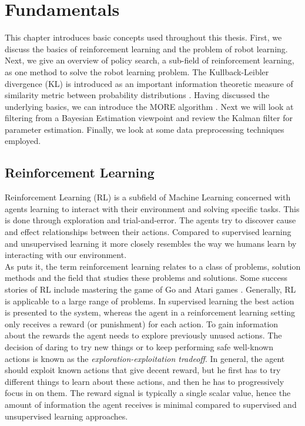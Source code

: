 
\chapter{Fundamentals}
This chapter introduces basic concepts used throughout this thesis.
First, we discuss the basics of reinforcement learning and
the problem of robot learning.
Next, we give an overview of policy search,
a sub-field of reinforcement learning,
as one method to solve the robot learning problem.
The Kullback-Leibler divergence (KL) is
introduced as an important information theoretic
measure of similarity metric between probability
distributions \citep{kullback1951information}.
Having discussed the underlying basics, we can
introduce the MORE algorithm \citep{abdolmaleki2015model}.
Next we will look at filtering from a Bayesian Estimation viewpoint and
review the Kalman filter for parameter estimation. Finally, we
look at some data preprocessing techniques employed.

\section{Reinforcement Learning}
Reinforcement Learning (RL) is a subfield of Machine Learning
concerned with agents
learning to interact with their environment and
solving specific tasks.
This is done through exploration and trial-and-error. The agents
try to discover cause and effect relationships between their actions.
Compared to supervised learning and unsupervised learning it
more closely resembles the way we humans learn by interacting
with our environment. \\
As \citet{sutton2018reinforcement} puts it,
the term reinforcement learning relates to a class of problems,
solution methods and the field that studies these problems and solutions.
Some success stories of RL include mastering the game of Go
\citep{silver2016mastering} and Atari games \citep{mnih2013playing}.
Generally, RL is applicable to a large range of problems.
In supervised learning the best action is presented to the system,
whereas the agent in a reinforcement learning setting only receives a
reward (or punishment) for each action.
To gain information about the rewards the agent needs
to explore previously unused actions.
The decision of daring to try new things or to keep performing safe
well-known actions is known as the
\textit{exploration-exploitation tradeoff}.
In general, the agent should exploit known actions that
give decent reward, but he first
has to try different things to learn about these actions,
and then he has to progressively focus in on them.
The reward signal is typically a single scalar value,
hence the amount of information
the agent receives is minimal compared to
supervised and unsupervised learning approaches.


